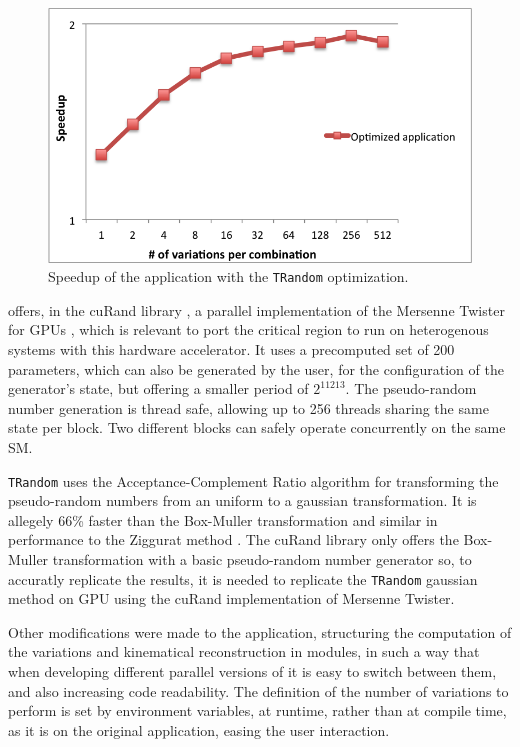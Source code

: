 \begin{figure}[!htp]
	\begin{center}
		\includegraphics[scale=0.7]{../../common/graphs/speedup_trandom_optim.png}  
		\caption{Speedup of the \tth application with the \texttt{TRandom} optimization.}
		\label{fig:TRandomOptim}
	\end{center}
\end{figure}

\nvidia offers, in the cuRand library \cite{NVIDIA:cuRand}, a parallel implementation of the Mersenne Twister for GPUs \cite{NVIDIA:MersenneTwister}, which is relevant to port the critical region to run on heterogenous systems with this hardware accelerator. It uses a precomputed set of 200 parameters, which can also be generated by the user, for the configuration of the generator's state, but offering a smaller period of $2^{11213}$. The pseudo-random number generation is thread safe, allowing up to 256 threads sharing the same state per block. Two different blocks can safely operate concurrently on the same SM.

\texttt{TRandom} uses the Acceptance-Complement Ratio algorithm \cite{AcceptanceRandom} for transforming the pseudo-random numbers from an uniform to a gaussian transformation. It is allegely 66\% faster than the Box-Muller transformation \cite{BoxMuller} and similar in performance to the Ziggurat method \cite{Ziggurat}. The cuRand library only offers the Box-Muller transformation with a basic pseudo-random number generator so, to accuratly replicate the results, it is needed to replicate the \texttt{TRandom} gaussian method on GPU using the cuRand implementation of Mersenne Twister.

Other modifications were made to the application, structuring the computation of the variations and kinematical reconstruction in modules, in such a way that when developing different parallel versions of \ttDilepKinFit it is easy to switch between them, and also increasing code readability. The definition of the number of variations to perform is set by environment variables, at runtime, rather than at compile time, as it is on the original application, easing the user interaction.
